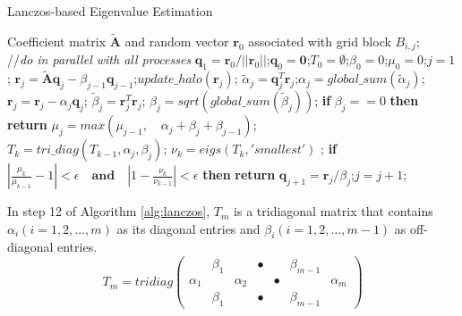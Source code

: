 \begin{algorithm}
\caption{Lanczos-based Eigenvalue Estimation}
\label{alg:lanczos}
\begin{algorithmic}[1]
\REQUIRE Coefficient matrix $\tilde{\textbf{A}}$ and random vector $\textbf{r}_0$ associated with grid block $B_{i,j}$; \\
 //\qquad    \textit{do in parallel with all processes}
\STATE $\textbf{q}_1 = \textbf{r}_0/||\textbf{r}_0||$;\quad $\textbf{q}_0=\textbf{0}$;\quad $T_0=\emptyset$;\quad $\beta_0 =0$;\quad  $\mu_0 =0$;\quad $j=1$;
\STATE $\textbf{r}_j=\tilde{\textbf{A}}\textbf{q}_j-\beta_{j-1}\textbf{q}_{j-1}$;\quad $update\_halo(\textbf{r}_j)$;
\STATE $\tilde{\alpha}_j =\textbf{q}_j^T\textbf{r}_j$;\quad $\alpha_j=global\_sum(\tilde{\alpha}_j)$; 
\STATE $\textbf{r}_j=\textbf{r}_j-\alpha_{j}\textbf{q}_{j}$;
\STATE $\tilde{\beta}_j = \textbf{r}_j^T\textbf{r}_j$; \quad $\beta_j=sqrt(global\_sum(\tilde{\beta}_j))$;
\STATE \textbf{if} $\beta_j == 0$ \textbf{then} \textbf{return}
\STATE $\mu_j = max(\mu_{j-1}, \quad \alpha_j+\beta_j+\beta_{j-1})$; \\
\STATE $T_k=tri\_diag(T_{k-1},\alpha_j,\beta_j)$; \quad $\nu_k = eigs(T_k,'smallest')$ ; 
\STATE \textbf{if} $|\frac{\mu_k}{\mu_{k-1}} -1 |< \epsilon\quad\textbf{and}\quad|1- \frac{\nu_k}{\nu_{k-1}}|< \epsilon$ \textbf{then} \textbf{return}
\STATE $\textbf{q}_{j+1}= \textbf{r}_j/\beta_j$;\quad $j=j+1$;
\ENDWHILE
\end{algorithmic}
\end{algorithm}
\vspace{-10pt}

In step 12 of Algorithm \ref{alg:lanczos}, $T_m$ is a tridiagonal matrix that contains $\alpha_i (i=1,2,...,m)$ as its diagonal entries and $\beta_i (i=1,2,...,m-1)$ as off-diagonal entries. 
\[ T_{m} = tridiag\left(\begin{array}{ccccccc}
&\beta_1 && \bullet & &\beta_{m-1}&    \\
\alpha_1 & &\alpha_2 && \bullet &&\alpha_{m}\\
&\beta_1 && \bullet & & \beta_{m-1}&
\end{array} \right)\]


